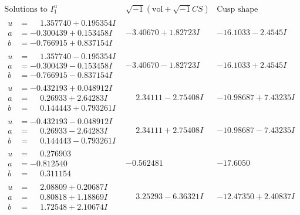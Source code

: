 \documentclass[1p]{elsarticle_modified}
\theoremstyle{definition}
\newcommand{\I}{\sqrt{-1}}
\begin{document}
$$\begin{array}{c|c|c}  
\text{Solutions to }I^u_{1}& \I (\text{vol} + \sqrt{-1}CS) & \text{Cusp shape}\\
 \hline 
\begin{aligned}
u &= \phantom{-}1.357740 + 0.195354 I \\
a &= -0.300439 + 0.153458 I \\
b &= -0.766915 + 0.837154 I\end{aligned}
 & -3.40670 + 1.82723 I & -16.1033 - 2.4545 I \\ \hline\begin{aligned}
u &= \phantom{-}1.357740 - 0.195354 I \\
a &= -0.300439 - 0.153458 I \\
b &= -0.766915 - 0.837154 I\end{aligned}
 & -3.40670 - 1.82723 I & -16.1033 + 2.4545 I \\ \hline\begin{aligned}
u &= -0.432193 + 0.048912 I \\
a &= \phantom{-}0.26933 + 2.64283 I \\
b &= \phantom{-}0.144443 + 0.793261 I\end{aligned}
 & \phantom{-}2.34111 - 2.75408 I & -10.98687 + 7.43235 I \\ \hline\begin{aligned}
u &= -0.432193 - 0.048912 I \\
a &= \phantom{-}0.26933 - 2.64283 I \\
b &= \phantom{-}0.144443 - 0.793261 I\end{aligned}
 & \phantom{-}2.34111 + 2.75408 I & -10.98687 - 7.43235 I \\ \hline\begin{aligned}
u &= \phantom{-}0.276903\phantom{ +0.000000I} \\
a &= -0.812540\phantom{ +0.000000I} \\
b &= \phantom{-}0.311154\phantom{ +0.000000I}\end{aligned}
 & -0.562481\phantom{ +0.000000I} & -17.6050\phantom{ +0.000000I} \\ \hline\begin{aligned}
u &= \phantom{-}2.08809 + 0.20687 I \\
a &= \phantom{-}0.80818 + 1.18869 I \\
b &= \phantom{-}1.72548 + 2.10674 I\end{aligned}
 & \phantom{-}3.25293 - 6.36321 I & -12.47350 + 2.40837 I \\ \hline\begin{aligned}

\end{aligned}
\end{array}$$
\end{document}
